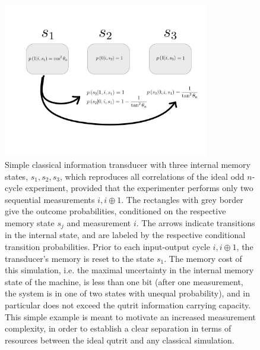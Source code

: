 \begin{figure}
\centering
\includegraphics[width=0.8\textwidth]{images/twomnts.jpg}
\caption{Simple classical information transducer with three internal memory states, $s_1, s_2, s_3$, which reproduces all correlations of the ideal odd $n$-cycle experiment, provided that the experimenter performs only two sequential measurements $i, i\oplus 1$. The rectangles with grey border give the outcome probabilities, conditioned on the respective memory state $s_j$ and measurement $i$. The arrows indicate transitions in the internal state, and are labeled by the respective conditional transition probabilities. Prior to each input-output cycle $i,i\oplus 1$, the transducer's memory is reset to the state $s_1$.
The memory cost of this simulation, i.e. the maximal uncertainty in the internal memory state of the machine, is less than one bit (after one measurement, the system is in one of two states with unequal probability), and in particular does not exceed the qutrit information carrying capacity. This simple example is meant to motivate an increased measurement complexity, in order to establish a clear separation in terms of resources between the ideal qutrit and any classical simulation.}
\label{fig:twomnts}
\end{figure}




